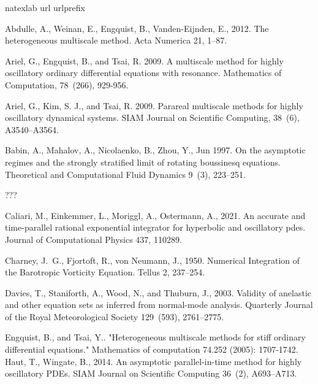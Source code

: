 \documentclass[a4,12pt]{article}
\renewenvironment{thebibliography}[1]{%
    \begin{oldthebibliography}{#1}%
    \setlength{\parskip}{0ex}%
    \setlength{\itemsep}{0ex}%
}%
                 {%
  \end{oldthebibliography}%
                 }
\begin{document}
\begin{thebibliography}{17}
\expandafter\ifx\csname natexlab\endcsname\relax\def\natexlab#1{#1}\fi
\expandafter\ifx\csname url\endcsname\relax
  \def\url#1{\texttt{#1}}\fi
\expandafter\ifx\csname urlprefix\endcsname\relax\def\urlprefix{URL }\fi

Abdulle, A., Weinan, E., Engquist, B., Vanden-Eijnden, E., 2012. The
  heterogeneous multiscale method. Acta Numerica 21, 1--87.

  Ariel, G., Engquist, B., and Tsai, R. 2009. A multiscale method for highly oscillatory ordinary differential equations with resonance. Mathematics of Computation, 78~(266), 929-956.

  Ariel, G., Kim, S. J., and Tsai, R. 2009. Parareal multiscale methods for highly oscillatory dynamical systems. SIAM Journal on Scientific Computing,
  38~(6), A3540--A3564.

Babin, A., Mahalov, A., Nicolaenko, B., Zhou, Y., Jun 1997. On the asymptotic
  regimes and the strongly stratified limit of rotating boussinesq equations.
  Theoretical and Computational Fluid Dynamics 9~(3), 223--251.

???


Caliari, M., Einkemmer, L., Moriggl, A., Ostermann, A., 2021. An accurate and
  time-parallel rational exponential integrator for hyperbolic and oscillatory
  pdes. Journal of Computational Physics 437, 110289.

Charney, J.~G., Fjortoft, R., von Neumann, J., 1950. Numerical {I}ntegration of
  the {B}arotropic {V}orticity {E}quation. Tellus 2, 237--254.

Davies, T., Staniforth, A., Wood, N., and Thuburn, J., 2003. Validity of anelastic
  and other equation sets as inferred from normal-mode analysis. Quarterly
  Journal of the Royal Meteorological Society 129~(593), 2761--2775.

Engquist, B., and Tsai, Y.. "Heterogeneous multiscale methods for stiff ordinary differential equations." Mathematics of computation 74.252 (2005): 1707-1742.
Haut, T., Wingate, B., 2014. An asymptotic parallel-in-time method for highly
  oscillatory {PDE}s. SIAM Journal on Scientific Computing 36~(2), A693--A713.


\end{thebibliography}
\end{document}
